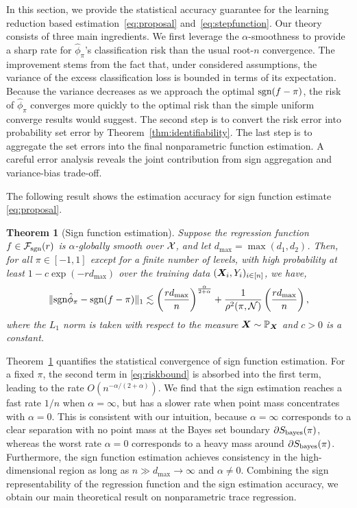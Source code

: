 \documentclass[aos]{imsart}
\newtheorem{theorem}{Theorem}%
\theoremstyle{definition}
\def\sign{\textup{sgn}}
\def\bayesS{S_{\textup{bayes}}}
\def\caliF{\tF_{\textup{sgn}}}
\begin{document}
In this section, we provide the statistical accuracy guarantee for the learning reduction based estimation~\eqref{eq:proposal} and~\eqref{eq:stepfunction}. Our theory consists of three main ingredients. We first leverage the $\alpha$-smoothness to provide a sharp rate for $\hat \phi_\pi$'s classification risk than the usual root-$n$ convergence. The improvement stems from the fact that, under considered assumptions, the variance of the excess classification loss is bounded in terms of its expectation. Because the variance decreases as we approach the optimal $\sign(f-\pi)$, the risk of $\hat \phi_\pi$ converges more quickly to the optimal risk than the simple uniform converge results would suggest.  The second step is to convert the risk error into probability set error by Theorem~\ref{thm:identifiability}. The last step is to aggregate the set errors into the final nonparametric function estimation. A careful error analysis reveals the joint contribution from sign aggregation and variance-bias trade-off. 

The following result shows the estimation accuracy for sign function estimate \eqref{eq:proposal}. 
\begin{theorem}[Sign function estimation]\label{thm:main} Suppose the regression function $f\in\caliF(r)$ is $\alpha$-globally smooth over $\mathcal{X}$, and let $d_{\max}=\max(d_1,d_2)$. Then, for all $\pi\in[-1,1]$ except for a finite number of levels, with high probability at least $1-c\exp(-rd_{\max})$ over the training data $(\bm X_i,Y_i)_{i\in[n]}$, we have, 
\begin{equation}\label{eq:riskbound}
\onenormSize{}{\sign \hat \phi_\pi- \sign(f-\pi)} \lesssim \left({rd_{\max} \over n}\right)^{\alpha\over 2+\alpha}+{1\over \rho^2(\pi, \tN)}\left({rd_{\max}\over n}\right),
\end{equation}
where the $L_1$ norm is taken with respect to the measure $\bm X\sim\mathbb{P}_{\bm X}$ and $c>0$ is a constant. 
\end{theorem}

\noindent
Theorem~\ref{thm:main} quantifies the statistical convergence of sign function estimation. For a fixed $\pi$, the second term in \eqref{eq:riskbound} is absorbed into the first term, leading to the rate $O(n^{-\alpha/(2+\alpha)})$. We find that the sign estimation reaches a fast rate $1/n$ when $\alpha =\infty$, but has a slower rate when point mass concentrates with $\alpha=0$. This is consistent with our intuition, because $\alpha = \infty$ corresponds to a clear separation with no point mass at the Bayes set boundary $\partial \bayesS(\pi)$, whereas the worst rate $\alpha = 0$ corresponds to a heavy mass around $\partial \bayesS(\pi)$. Furthermore, the sign function estimation achieves consistency in the high-dimensional region as long as $n \gg d_{\max}\to \infty$ and $\alpha\neq 0$. Combining the sign representability of the regression function and the sign estimation accuracy, we obtain our main theoretical result on nonparametric trace regression. 
\end{document}
